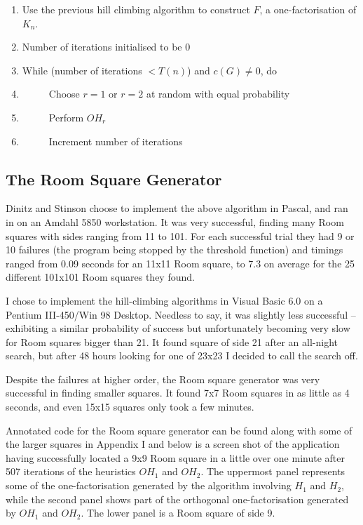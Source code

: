\documentclass[
  12pt,
  a4paper]{book}
\begin{document}
\begin{enumerate}
\def\labelenumi{\arabic{enumi}.}
\item
  Use the previous hill climbing algorithm to construct \(F\), a
  one-factorisation of \(K_n\).
\item
  Number of iterations initialised to be \(0\)
\item
  While (number of iterations \(<T(n)\)) and \(c(G) \neq 0\), do
\item
  \(\hspace{1cm}\) Choose \(r=1\) or \(r=2\) at random with equal
  probability
\item
  \(\hspace{1cm}\) Perform \(OH_r\)
\item
  \(\hspace{1cm}\) Increment number of iterations
\end{enumerate}

\hypertarget{the-room-square-generator}{%
\subsection{The Room Square Generator}\label{the-room-square-generator}}

Dinitz and Stinson choose to implement the above algorithm in Pascal,
and ran in on an Amdahl 5850 workstation. It was very successful,
finding many Room squares with sides ranging from 11 to 101. For each
successful trial they had 9 or 10 failures (the program being stopped by
the threshold function) and timings ranged from 0.09 seconds for an
11x11 Room square, to 7.3 on average for the 25 different 101x101 Room
squares they found.

I chose to implement the hill-climbing algorithms in Visual Basic 6.0 on
a Pentium III-450/Win 98 Desktop. Needless to say, it was slightly less
successful -- exhibiting a similar probability of success but
unfortunately becoming very slow for Room squares bigger than 21. It
found square of side 21 after an all-night search, but after 48 hours
looking for one of 23x23 I decided to call the search off.

Despite the failures at higher order, the Room square generator was very
successful in finding smaller squares. It found 7x7 Room squares in as
little as 4 seconds, and even 15x15 squares only took a few minutes.

Annotated code for the Room square generator can be found along with
some of the larger squares in Appendix I and below is a screen shot of
the application having successfully located a 9x9 Room square in a
little over one minute after 507 iterations of the heuristics \(OH_1\) and
\(OH_2\). The uppermost panel represents some of the one-factorisation
generated by the algorithm involving \(H_1\) and \(H_2\), while the second
panel shows part of the orthogonal one-factorisation generated by \(OH_1\)
and \(OH_2\). The lower panel is a Room square of side 9.
\end{document}
